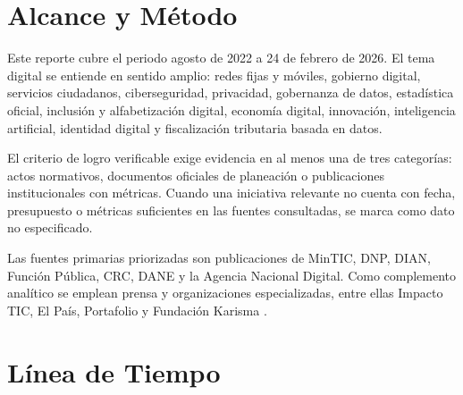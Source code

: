\documentclass[9pt,a4paper,twoside]{rho-class/rho}
\begin{document}
\section{Alcance y Método}

Este reporte cubre el periodo agosto de 2022 a 24 de febrero de 2026. El tema digital se entiende en sentido amplio: redes fijas y móviles, gobierno digital, servicios ciudadanos, ciberseguridad, privacidad, gobernanza de datos, estadística oficial, inclusión y alfabetización digital, economía digital, innovación, inteligencia artificial, identidad digital y fiscalización tributaria basada en datos.

El criterio de logro verificable exige evidencia en al menos una de tres categorías: actos normativos, documentos oficiales de planeación o publicaciones institucionales con métricas. Cuando una iniciativa relevante no cuenta con fecha, presupuesto o métricas suficientes en las fuentes consultadas, se marca como dato no especificado.

Las fuentes primarias priorizadas son publicaciones de MinTIC, DNP, DIAN, Función Pública, CRC, DANE y la Agencia Nacional Digital. Como complemento analítico se emplean prensa y organizaciones especializadas, entre ellas Impacto TIC, El País, Portafolio y Fundación Karisma \cite{castro_5g_colombia_2023,lewin_subasta_5g_el_pais_2023,lorduy_telecall_conciliacion_2026,karisma_habemus_2023}.

\section{Línea de Tiempo}
\end{document}
